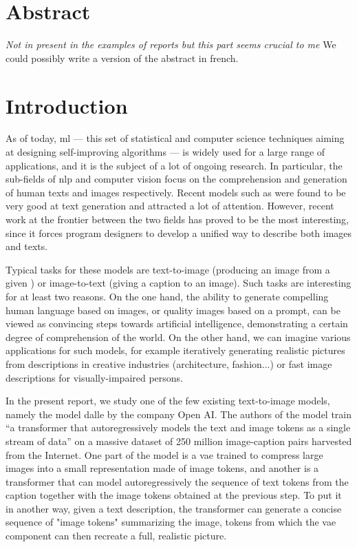 \documentclass{article}
\begin{document}
\pagebreak
\section{Abstract}
\textit{Not in present in the examples of reports but this part seems crucial to me}
We could possibly write a version of the abstract in french. 

\pagebreak
\section{Introduction}

\begin{multicols}{2}

As of today, \gls{ml} — this set of statistical and computer science techniques aiming at designing self-improving algorithms — is widely used for a large range of applications, and it is the subject of a lot of ongoing research. In particular, the sub-fields of \gls{nlp} and computer vision focus on the comprehension and generation of human texts and images respectively. Recent models such as  were found to be very good at text generation and attracted a lot of attention. However, recent work at the frontier between the two fields has proved to be the most interesting, since it forces program designers to develop a unified way to describe both images and texts.

Typical tasks for these models are text-to-image (producing an image from a given ) or image-to-text (giving a caption to an image). Such tasks are interesting for at least two reasons. On the one hand, the ability to generate compelling human language based on images, or quality images based on a prompt, can be viewed as convincing steps towards artificial intelligence, demonstrating a certain degree of comprehension of the world. On the other hand, we can imagine various applications for such models, for example iteratively generating realistic pictures from descriptions in creative industries (architecture, fashion...) or fast image descriptions for visually-impaired persons. 

In the present report, we study one of the few existing text-to-image models, namely the model \gls{dalle} by the company Open AI. The authors of the model train \enquote{a transformer that autoregressively models the text and image tokens as a single stream of data} on a massive dataset of 250 million image-caption pairs harvested from the Internet. One part of the model is a \gls{vae} trained to compress large images into a small representation made of image \glspl{token}, and another is a \gls{transformer} that can model autoregressively the sequence of text tokens from the caption together with the image tokens obtained at the previous step. To put it in another way, given a text description, the transformer can generate a concise sequence of "image tokens" summarizing the image, tokens from which the \gls{vae} component can then recreate a full, realistic picture.


\end{multicols}
\end{document}

